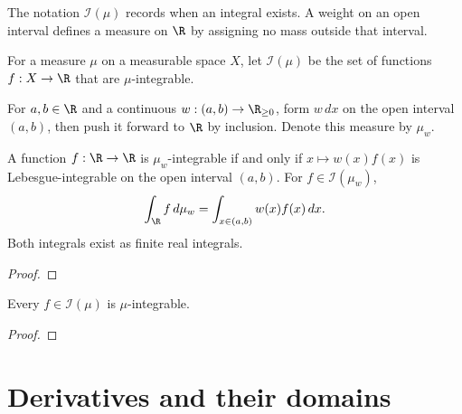 The notation $\mathcal I(\mu)$ records when an integral exists. A weight on an open interval defines a measure on $\R$ by assigning no mass outside that interval.

\begin{definition}
\label{def:integrable-input}
\leanok
For a measure $\mu$ on a measurable space $X$, let $\mathcal I(\mu)$ be the set of functions $f:X\to\R$ that are $\mu$-integrable.
\end{definition}

\begin{definition}
\label{def:open-interval-weight-measure}
\leanok
For $a,b\in\R$ and a continuous $w:(a,b)\to\R_{\ge0}$, form $w\,dx$ on the open interval $(a,b)$, then push it forward to $\R$ by inclusion. Denote this measure by $\mu_w$.
\end{definition}

\begin{theorem}
\label{thm:open-interval-weight-measure}
\leanok
A function $f:\R\to\R$ is $\mu_w$-integrable if and only if $x\mapsto w(x)f(x)$ is Lebesgue-integrable on the open interval $(a,b)$. For $f\in\mathcal I(\mu_w)$,
\[\int_{\R} f\,d\mu_w=\int_{x\in(a,b)}w(x)f(x)\,dx.\]
Both integrals exist as finite real integrals.
\end{theorem}
\begin{proof}
\leanok
\end{proof}

\begin{supporting}

\begin{theorem}
\label{thm:integrable-input}
\leanok
Every $f\in\mathcal I(\mu)$ is $\mu$-integrable.
\end{theorem}
\begin{proof}
\leanok
\end{proof}

\end{supporting}

\section{Derivatives and their domains}\label{sec:textbook-foundations-derivatives}

